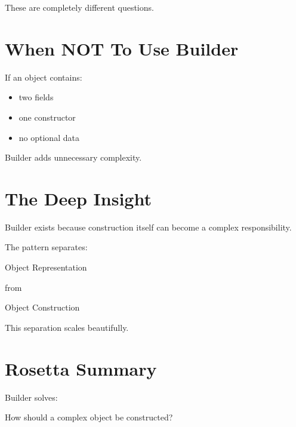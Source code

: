 \documentclass[11pt,a4paper]{book}
\begin{document}
These are completely different questions.


\section{When NOT To Use Builder}

\begin{trap}

If an object contains:

\begin{itemize}

\item two fields

\item one constructor

\item no optional data

\end{itemize}

Builder adds unnecessary complexity.

\end{trap}


\section{The Deep Insight}

\begin{idea}

Builder exists because construction itself can
become a complex responsibility.

The pattern separates:

Object Representation

from

Object Construction

\end{idea}

This separation scales beautifully.


\section{Rosetta Summary}

\begin{rosettarule}

Builder solves:

\begin{center}
How should a complex object be constructed?
\end{center}

\end{rosettarule}
\end{document}
